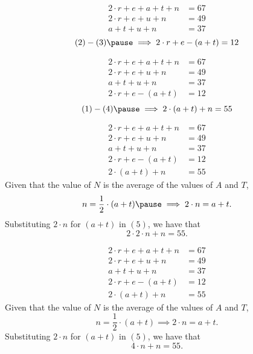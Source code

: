 \documentclass{beamer} %
\begin{document}
\begin{frame}
  \begin{align}
    2\cdot r+e+a+t+n &= 67 \\
    2\cdot r+e+u+n &= 49   \\
    a+t+u+n &= 37
  \end{align}\pause
  \[
    (2) - (3) \pause \implies 2\cdot r+e-(a+t)=12
  \]
\end{frame}

\setcounter{equation}{0}

\begin{frame}
  \begin{align}
    2\cdot r+e+a+t+n &= 67 \\
    2\cdot r+e+u+n &= 49   \\
    a+t+u+n &= 37          \\
    2\cdot r+e-(a+t) &= 12
  \end{align}\pause
  \[
    (1) - (4) \pause \implies 2\cdot(a+t)+n=55
  \]
\end{frame}

\setcounter{equation}{0}

\begin{frame}
  \begin{align}
    2\cdot r+e+a+t+n &= 67 \\
    2\cdot r+e+u+n &= 49   \\
    a+t+u+n &= 37          \\
    2\cdot r+e-(a+t) &= 12 \\
    2\cdot(a+t)+n &= 55
  \end{align}\pause
  Given that the value of $N$ is the average of the values of $A$ and $T$,\pause
  \[
    n=\frac{1}{2}\cdot(a+t) \pause \implies 2 \cdot n = a + t.
  \]\pause
  Substituting $2\cdot n$ for $(a+t)$ in $(5)$, we have that\pause
  \[
    2\cdot 2\cdot n+n=55.
  \]
\end{frame}

\setcounter{equation}{0}

\begin{frame}
  \begin{align}
    2\cdot r+e+a+t+n &= 67 \\
    2\cdot r+e+u+n &= 49   \\
    a+t+u+n &= 37          \\
    2\cdot r+e-(a+t) &= 12 \\
    2\cdot(a+t)+n &= 55
  \end{align}
  Given that the value of $N$ is the average of the values of $A$ and $T$,
  \[
    n=\frac{1}{2}\cdot(a+t) \implies 2 \cdot n = a + t.
  \]
  Substituting $2\cdot n$ for $(a+t)$ in $(5)$, we have that
  \[
    4\cdot n+n=55.
  \]
\end{frame}
\end{document}

